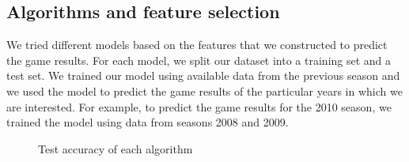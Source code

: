 \documentclass{article} %
\begin{document}
	
	\subsection{Algorithms and feature selection}
	 We tried different models based on the features that we constructed to predict the game results. For each model, we split our dataset into a training set and a test set. 
	 We trained our model using available data from the previous season and we used the model to predict the game results of the particular years in which we are interested. For example, to predict the game results for the 2010 season, we trained the model using data from seasons 2008 and 2009. %
	
	\begin{figure}[h]
	\centerline{}
	\caption{Test accuracy of each algorithm }
	\label{diffmodel}
	\end{figure} 
	
	
\end{document}
